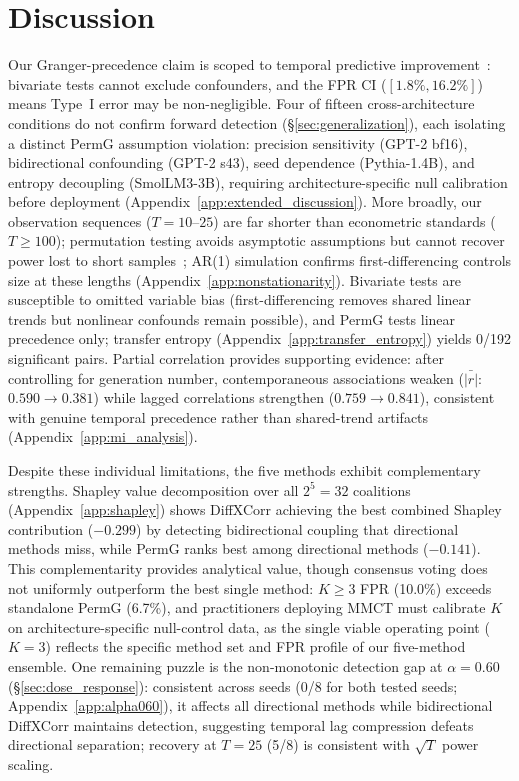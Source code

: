 \section{Discussion}\label{sec:discussion}

Our Granger-precedence claim is scoped to temporal predictive improvement~\citep{granger1969investigating,shojaie2022granger}: bivariate tests cannot exclude confounders, and the FPR CI ($[1.8\%, 16.2\%]$) means Type~I error may be non-negligible.
Four of fifteen cross-architecture conditions do not confirm forward detection (\S\ref{sec:generalization}), each isolating a distinct PermG assumption violation: precision sensitivity (GPT-2 bf16), bidirectional confounding (GPT-2 s43), seed dependence (Pythia-1.4B), and entropy decoupling (SmolLM3-3B), requiring architecture-specific null calibration before deployment (Appendix~\ref{app:extended_discussion}).
More broadly, our observation sequences ($T{=}10$--$25$) are far shorter than econometric standards ($T{\geq}100$); permutation testing avoids asymptotic assumptions but cannot recover power lost to short samples~\citep{shojaie2022granger}; AR(1) simulation confirms first-differencing controls size at these lengths (Appendix~\ref{app:nonstationarity}).
Bivariate tests are susceptible to omitted variable bias (first-differencing removes shared linear trends but nonlinear confounds remain possible), and PermG tests linear precedence only; transfer entropy (Appendix~\ref{app:transfer_entropy}) yields 0/192 significant pairs.
Partial correlation provides supporting evidence: after controlling for generation number, contemporaneous associations weaken ($\bar{|r|}$: $0.590{\to}0.381$) while lagged correlations strengthen ($0.759{\to}0.841$), consistent with genuine temporal precedence rather than shared-trend artifacts (Appendix~\ref{app:mi_analysis}).

Despite these individual limitations, the five methods exhibit complementary strengths.
Shapley value decomposition over all $2^5{=}32$ coalitions (Appendix~\ref{app:shapley}) shows DiffXCorr achieving the best combined Shapley contribution ($-0.299$) by detecting bidirectional coupling that directional methods miss, while PermG ranks best among directional methods ($-0.141$).
This complementarity provides analytical value, though consensus voting does not uniformly outperform the best single method: $K{\geq}3$ FPR (10.0\%) exceeds standalone PermG (6.7\%), and practitioners deploying MMCT must calibrate $K$ on architecture-specific null-control data, as the single viable operating point ($K{=}3$) reflects the specific method set and FPR profile of our five-method ensemble.
One remaining puzzle is the non-monotonic detection gap at $\alpha{=}0.60$ (\S\ref{sec:dose_response}): consistent across seeds (0/8 for both tested seeds; Appendix~\ref{app:alpha060}), it affects all directional methods while bidirectional DiffXCorr maintains detection, suggesting temporal lag compression defeats directional separation; recovery at $T{=}25$ (5/8) is consistent with $\sqrt{T}$ power scaling.

